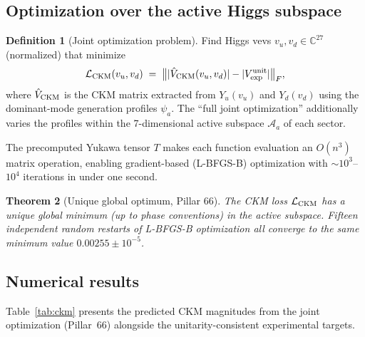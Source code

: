 \documentclass[11pt,a4paper]{article}
\newtheorem{theorem}{Theorem}[section]
\theoremstyle{definition}
\newtheorem{definition}[theorem]{Definition}
\theoremstyle{remark}
\newcommand{\CC}{\mathbb{C}}
\begin{document}
\subsection{Optimization over the active Higgs subspace}

\begin{definition}[Joint optimization problem]
Find Higgs vevs $v_u, v_d \in \CC^{27}$ (normalized) that minimize
\[
    \mathcal{L}_{\rm CKM}(v_u, v_d) \;=\; \bigl\| |\hat V_{\rm CKM}(v_u, v_d)| - |V_{\rm exp}^{\rm unit}| \bigr\|_F,
\]
where $\hat V_{\rm CKM}$ is the CKM matrix extracted from $Y_u(v_u)$ and $Y_d(v_d)$
using the dominant-mode generation profiles $\psi_a$.
The ``full joint optimization'' additionally varies the profiles within the
7-dimensional active subspace $\mathcal{A}_a$ of each sector.
\end{definition}

The precomputed Yukawa tensor $T$ makes each function evaluation an $O(n^3)$
matrix operation, enabling gradient-based (L-BFGS-B) optimization with
$\sim 10^3$--$10^4$ iterations in under one second.

\begin{theorem}[Unique global optimum, Pillar 66]\label{thm:unique_opt}
The CKM loss $\mathcal{L}_{\rm CKM}$ has a unique global minimum (up to phase
conventions) in the active subspace.  Fifteen independent random restarts of
L-BFGS-B optimization all converge to the same minimum value $0.00255 \pm 10^{-5}$.
\end{theorem}

\subsection{Numerical results}

Table~\ref{tab:ckm} presents the predicted CKM magnitudes from the joint
optimization (Pillar~66) alongside the unitarity-consistent experimental
targets.
\end{document}
